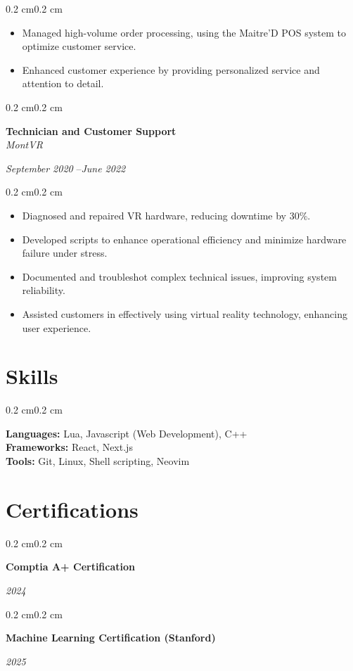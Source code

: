 \documentclass[10pt, letterpaper]{article}
\newenvironment{highlights}{%
    \begin{itemize}[
        topsep=0.10 cm,%
        parsep=0.10 cm,%
        partopsep=0pt,%
        itemsep=0pt,%
        leftmargin=0.4 cm + 10pt%
    ]
}{%
    \end{itemize}%
}
\newenvironment{onecolentry}{%
    \begin{adjustwidth}{0.2 cm}{0.2 cm}%
}{%
    \end{adjustwidth}%
}
\newenvironment{twocolentry}[1]{%
    \begin{onecolentry}%
    \def\twocolentryarg{#1}%
    \noindent
    \begin{minipage}[t]{0.68\textwidth} %
}{%
    \end{minipage}\hfill%
    \begin{minipage}[t]{0.30\textwidth} %
      \raggedleft\twocolentryarg
    \end{minipage}%
    \vspace{0.2cm}%
    \end{onecolentry}%
}
\begin{document}
\vspace{0.10 cm}
\begin{onecolentry}
    \begin{highlights}
        \item Managed high-volume order processing, using the Maitre'D POS system to optimize customer service.
        \item Enhanced customer experience by providing personalized service and attention to detail.
    \end{highlights}
\end{onecolentry}
\vspace{0.2 cm}
\begin{twocolentry}{%
\textit{September 2020 }--\textit{June 2022} \\[0.1cm]
\textit{}%
}
    \textbf{Technician and Customer Support }\\
    \textit{MontVR }
\end{twocolentry}
\vspace{0.10 cm}
\begin{onecolentry}
    \begin{highlights}
        \item Diagnosed and repaired VR hardware, reducing downtime by 30\%.
        \item Developed scripts to enhance operational efficiency and minimize hardware failure under stress.
        \item Documented and troubleshot complex technical issues, improving system reliability.
        \item Assisted customers in effectively using virtual reality technology, enhancing user experience.
    \end{highlights}
\end{onecolentry}
\vspace{0.2 cm}


\section{Skills}
\begin{onecolentry}
    \textbf{Languages:} Lua, Javascript (Web Development), C++\\
    \textbf{Frameworks:} React, Next.js\\
    \textbf{Tools:} Git, Linux, Shell scripting, Neovim\\
\end{onecolentry}

\section{Certifications}
\begin{twocolentry}{\textit{2024}}
    \textbf{Comptia A+ Certification }\\
    \textit{ }
\end{twocolentry}
\vspace{0.10 cm}
\begin{twocolentry}{\textit{2025}}
    \textbf{Machine Learning Certification (Stanford) }\\
    \textit{ }
\end{twocolentry}
\vspace{0.10 cm}
\end{document}
